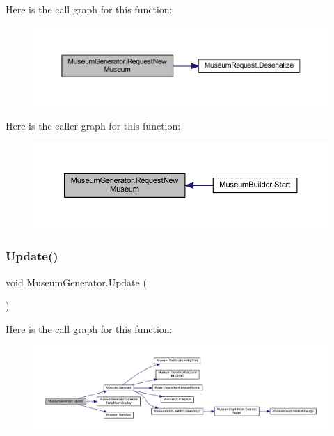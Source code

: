 Here is the call graph for this function\+:
\nopagebreak
\begin{figure}[H]
\begin{center}
\leavevmode
\includegraphics[width=350pt]{class_museum_generator_a5ead852effaa81309fe98b4d61fe9759_cgraph}
\end{center}
\end{figure}
Here is the caller graph for this function\+:
\nopagebreak
\begin{figure}[H]
\begin{center}
\leavevmode
\includegraphics[width=350pt]{class_museum_generator_a5ead852effaa81309fe98b4d61fe9759_icgraph}
\end{center}
\end{figure}
\mbox{\label{class_museum_generator_afa0b7c3e8ab1bccedc4c7828cbf4724e}} 
\subsubsection{\texorpdfstring{Update()}{Update()}}
{\footnotesize\ttfamily void Museum\+Generator.\+Update (\begin{DoxyParamCaption}{ }\end{DoxyParamCaption})\hspace{0.3cm}{\ttfamily [private]}}

Here is the call graph for this function\+:
\nopagebreak
\begin{figure}[H]
\begin{center}
\leavevmode
\includegraphics[width=350pt]{class_museum_generator_afa0b7c3e8ab1bccedc4c7828cbf4724e_cgraph}
\end{center}
\end{figure}


